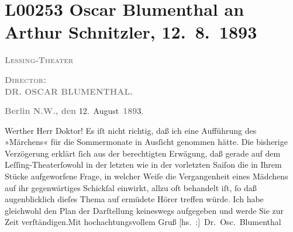 

\section[Oscar Blumenthal an Arthur Schnitzler, 12. 8. 1893]{L00253 Oscar Blumenthal an Arthur Schnitzler, 12. 8. 1893}
\nopagebreak{}
\rehead{ }\normalsize\beginnumbering{}
\toendnotes[C]{\smallbreak\pagebreak[2]}
\toendnotes[C]{\smallbreak}
\pstart
           \centering{}{\pb}\textcolor{gray}{\textbf{\textsc{Lessing-Theater}}}\pend
           
\pstart
           \centering{}\textcolor{gray}{\textbf{\textsc{Director}:}}{\\}\textcolor{gray}{\textbf{DR. OSCAR BLUMENTHAL.}}\pend
           
\pstart
           \raggedleft{}\textcolor{gray}{\textbf{Berlin N.W., den}}{ }12. August \textcolor{gray}{\textbf{189}}3.\pend
           
\pstart\center{}Werther Herr Doktor!\pend\vspace{0.5em}
\pstart
           Es iſt nicht richtig, daß ich eine Aufführung des »Märchens« für die Sommermonate in Ausſicht genommen hätte. Die
               bisherige Verzögerung erklärt ſich aus der berechtigten Erwägung, daß gerade auf dem
                  Leſſing-Theaterſowohl in der letzten wie in der vorletzten Saiſon
               die in Ihrem Stücke
               aufgeworfene Frage, in welcher Weiſe die Vergangenheit eines Mädchens auf ihr
               gegenwärtiges Schickſal einwirkt, allzu oft behandelt iſt, ſo daß augenblicklich
               dieſes Thema auf ermüdete Hörer treffen würde. Ich habe gleichwohl den Plan der
               Darſtellung keineswegs aufgegeben und werde Sie zur Zeit verſtändigen.\hspace*{2.5em}Mit hochachtungsvollem Gruß\pend
           \pstart \spacefill\mbox{{[}hs. :{]} Dr. Osc. Blumenthal}\pend{}\endnumbering{}  
      